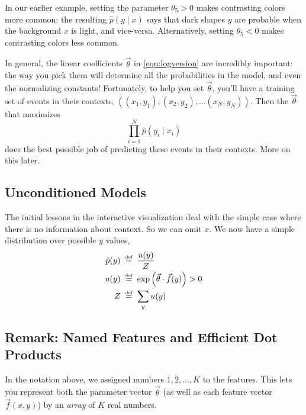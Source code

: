 \documentclass[11pt]{article}
\newcommand{\defeq}{\;\stackrel{\mbox{\tiny def}}{=}\;}
\newcommand{\vtheta}{\vec{\theta}}
\newcommand{\ph}{\hat{p}}
\begin{document}

In our earlier example, setting the parameter $\theta_5 > 0$ makes
contrasting colors more common: the resulting $\ph(y \mid x)$ says
that dark shapes $y$ are probable when the background $x$ is light,
and vice-versa.  Alternatively, setting $\theta_5 < 0$ makes
contrasting colors less common.

In general, the linear coefficients $\vtheta$ in \eqref{eqn:logversion} are incredibly
important: the way you pick them will determine all the probabilities
in the model, and even the normalizing constants!  Fortunately, to
help you set $\vtheta$, you'll have a training set of events in their
contexts, $((x_1,y_1), (x_2,y_2), \ldots (x_N,y_N))$.  Then the
$\vtheta$ that maximizes
\begin{equation}\label{eqn:loglin-likelihood}
\prod_{i=1}^N \ph(y_i \mid x_i)
\end{equation}
does the best possible job of predicting these events in their
contexts.  More on this later.

\subsection{Unconditioned Models}

The initial lessons in the interactive visualization deal with the
simple case where there is no information about context.  So we can
omit $x$.  We now have a simple distribution over possible $y$ values,
\begin{align}
  \ph(y) &\defeq \frac{u(y)}{Z} \\
  u(y) &\defeq \exp \left(\vtheta \cdot \vec{f}(y)\right) > 0 \\
  Z &\defeq \sum_y u(y)
\end{align}

\subsection{Remark: Named Features and Efficient Dot Products}

In the notation above, we assigned numbers $1,2,\ldots,K$ to the
features.  This lets you represent both the parameter vector $\vtheta$
(as well as each feature vector $\vec{f}(x,y)$) by an {\em array} of
$K$ real numbers.
\end{document}
